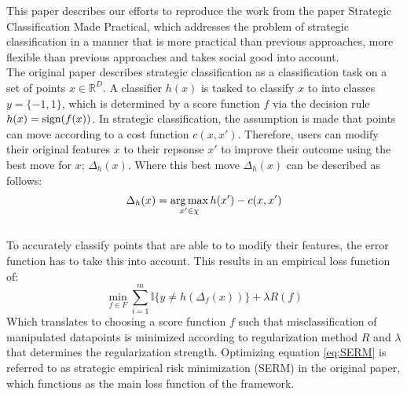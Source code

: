 

This paper describes our efforts to reproduce the work from the paper Strategic Classification Made Practical\cite{levanon2021strategic}, which addresses the problem of strategic classification in a manner that is more practical than previous approaches, more flexible than previous approaches and takes social good into account.\\
The original paper describes strategic classification as a classification task on a set of points $x \in \mathbb{R}^D$. A classifier $h(x)$ is tasked to classify $x$ to into classes $y = \{-1,1\}$, which is determined by a score function $f$ via the decision rule $h(x) = \operatorname{sign}(f(x))$. In strategic classification, the assumption is made that points can move according to a cost function $c(x,x')$. Therefore, users can modify their original features $x$ to their repsonse $x'$ to improve their outcome using the best move for $x$; $\Delta_{h}(x)$. Where this best move $\Delta_{h}(x)$ can be described as follows: 
\begin{equation} \label{eq:resp_map}
  \Delta_{h}(x) = \operatorname*{arg\,max}_{x' \in \chi} h(x') - c(x,x') 
\end{equation}\\
To accurately classify points that are able to to modify their features, the error function has to take this into account. This results in an empirical loss function of: 
\begin{equation} \label{eq:SERM}
 \min_{f \in F} \sum^m_{i=1} \mathds{I}\{y \neq h(\Delta_{f}(x))\} + \lambda R(f)
\end{equation}
Which translates to choosing a score function $f$ such that misclassification of manipulated datapoints is minimized according to regularization method $R$ and $\lambda$ that determines the regularization strength. Optimizing equation \ref{eq:SERM} is referred to as strategic empirical risk minimization (SERM) in the original paper, which functions as the main loss function of the framework.

